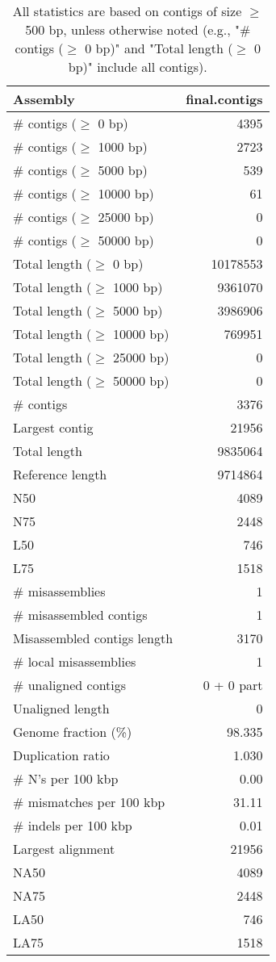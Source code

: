 \documentclass[12pt,a4paper]{article}
\begin{document}
\begin{table}[ht]
\begin{center}
\caption{All statistics are based on contigs of size $\geq$ 500 bp, unless otherwise noted (e.g., "\# contigs ($\geq$ 0 bp)" and "Total length ($\geq$ 0 bp)" include all contigs).}
\begin{tabular}{|l*{1}{|r}|}
\hline
Assembly & final.contigs \\ \hline
\# contigs ($\geq$ 0 bp) & 4395 \\ \hline
\# contigs ($\geq$ 1000 bp) & 2723 \\ \hline
\# contigs ($\geq$ 5000 bp) & 539 \\ \hline
\# contigs ($\geq$ 10000 bp) & 61 \\ \hline
\# contigs ($\geq$ 25000 bp) & 0 \\ \hline
\# contigs ($\geq$ 50000 bp) & 0 \\ \hline
Total length ($\geq$ 0 bp) & 10178553 \\ \hline
Total length ($\geq$ 1000 bp) & 9361070 \\ \hline
Total length ($\geq$ 5000 bp) & 3986906 \\ \hline
Total length ($\geq$ 10000 bp) & 769951 \\ \hline
Total length ($\geq$ 25000 bp) & 0 \\ \hline
Total length ($\geq$ 50000 bp) & 0 \\ \hline
\# contigs & 3376 \\ \hline
Largest contig & 21956 \\ \hline
Total length & 9835064 \\ \hline
Reference length & 9714864 \\ \hline
N50 & 4089 \\ \hline
N75 & 2448 \\ \hline
L50 & 746 \\ \hline
L75 & 1518 \\ \hline
\# misassemblies & 1 \\ \hline
\# misassembled contigs & 1 \\ \hline
Misassembled contigs length & 3170 \\ \hline
\# local misassemblies & 1 \\ \hline
\# unaligned contigs & 0 + 0 part \\ \hline
Unaligned length & 0 \\ \hline
Genome fraction (\%) & 98.335 \\ \hline
Duplication ratio & 1.030 \\ \hline
\# N's per 100 kbp & 0.00 \\ \hline
\# mismatches per 100 kbp & 31.11 \\ \hline
\# indels per 100 kbp & 0.01 \\ \hline
Largest alignment & 21956 \\ \hline
NA50 & 4089 \\ \hline
NA75 & 2448 \\ \hline
LA50 & 746 \\ \hline
LA75 & 1518 \\ \hline
\end{tabular}
\end{center}
\end{table}
\end{document}
